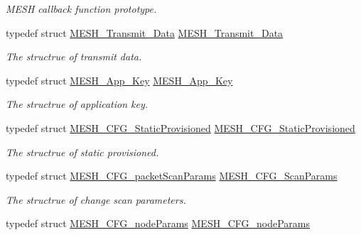 \begin{DoxyCompactItemize}
\begin{DoxyCompactList}\small\item\em M\+E\+SH callback function prototype. \end{DoxyCompactList}\item 
typedef struct \hyperlink{struct_m_e_s_h___transmit___data}{M\+E\+S\+H\+\_\+\+Transmit\+\_\+\+Data} \hyperlink{group___m_e_s_h_gaf94f62d4935fc276c482ed909f9370a2}{M\+E\+S\+H\+\_\+\+Transmit\+\_\+\+Data}\hypertarget{group___m_e_s_h_gaf94f62d4935fc276c482ed909f9370a2}{}\label{group___m_e_s_h_gaf94f62d4935fc276c482ed909f9370a2}

\begin{DoxyCompactList}\small\item\em The structrue of transmit data. \end{DoxyCompactList}\item 
typedef struct \hyperlink{struct_m_e_s_h___app___key}{M\+E\+S\+H\+\_\+\+App\+\_\+\+Key} \hyperlink{group___m_e_s_h_gae88953e099430852c312d13a99d8c735}{M\+E\+S\+H\+\_\+\+App\+\_\+\+Key}\hypertarget{group___m_e_s_h_gae88953e099430852c312d13a99d8c735}{}\label{group___m_e_s_h_gae88953e099430852c312d13a99d8c735}

\begin{DoxyCompactList}\small\item\em The structrue of application key. \end{DoxyCompactList}\item 
typedef struct \hyperlink{struct_m_e_s_h___c_f_g___static_provisioned}{M\+E\+S\+H\+\_\+\+C\+F\+G\+\_\+\+Static\+Provisioned} \hyperlink{group___m_e_s_h_gaa0b2f4271ec8274ad38f1bc4d5796788}{M\+E\+S\+H\+\_\+\+C\+F\+G\+\_\+\+Static\+Provisioned}\hypertarget{group___m_e_s_h_gaa0b2f4271ec8274ad38f1bc4d5796788}{}\label{group___m_e_s_h_gaa0b2f4271ec8274ad38f1bc4d5796788}

\begin{DoxyCompactList}\small\item\em The structrue of static provisioned. \end{DoxyCompactList}\item 
typedef struct \hyperlink{struct_m_e_s_h___c_f_g__packet_scan_params}{M\+E\+S\+H\+\_\+\+C\+F\+G\+\_\+packet\+Scan\+Params} \hyperlink{group___m_e_s_h_gad3b42c59d6315c75d9435d55fcbe3ac1}{M\+E\+S\+H\+\_\+\+C\+F\+G\+\_\+\+Scan\+Params}\hypertarget{group___m_e_s_h_gad3b42c59d6315c75d9435d55fcbe3ac1}{}\label{group___m_e_s_h_gad3b42c59d6315c75d9435d55fcbe3ac1}

\begin{DoxyCompactList}\small\item\em The structrue of change scan parameters. \end{DoxyCompactList}\item 
typedef struct \hyperlink{struct_m_e_s_h___c_f_g__node_params}{M\+E\+S\+H\+\_\+\+C\+F\+G\+\_\+node\+Params} \hyperlink{group___m_e_s_h_ga100debe22893bca692e5a89a5d51b392}{M\+E\+S\+H\+\_\+\+C\+F\+G\+\_\+node\+Params}\hypertarget{group___m_e_s_h_ga100debe22893bca692e5a89a5d51b392}{}\label{group___m_e_s_h_ga100debe22893bca692e5a89a5d51b392}


\end{DoxyCompactItemize}
